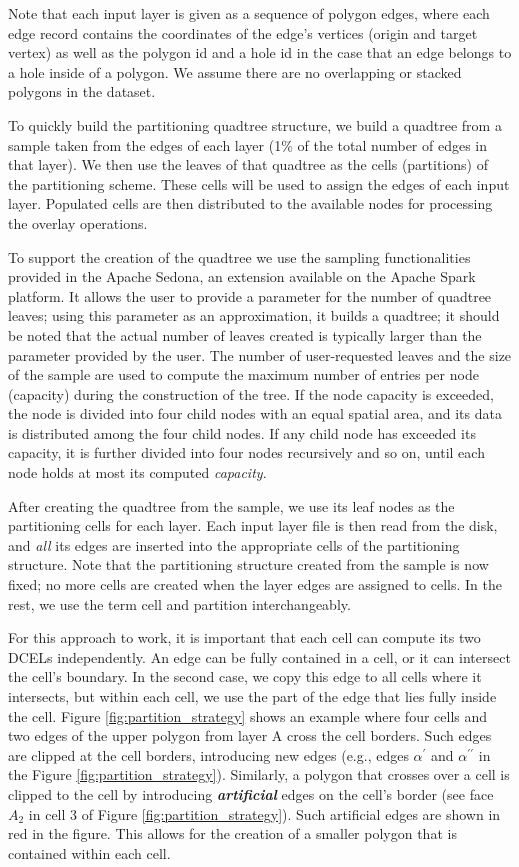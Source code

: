 Note that each input layer is given as a sequence of polygon edges, where each edge record contains the coordinates of the edge's vertices (origin and target 
vertex) as well as the polygon id and a hole id in the case that an edge belongs to a hole inside of a polygon. We assume there are no overlapping or stacked 
polygons in the dataset. 

To quickly build the partitioning quadtree structure, we build a quadtree from a sample taken from the edges of each layer (1\% of the total number of edges in 
that layer). We then use the leaves of that quadtree as the cells (partitions) of the partitioning scheme. These cells will be used to assign the edges of each 
input layer. Populated cells are then distributed to the available nodes for processing the overlay operations. 

To support the creation of the quadtree we use the sampling functionalities provided in the Apache Sedona, an extension available on the Apache Spark platform. 
It allows the user to provide a parameter for the number of quadtree leaves; using this parameter as an approximation, it builds a quadtree; it should be noted 
that the actual number of leaves created is typically larger than the parameter provided by the user. The number of user-requested leaves and the size of the 
sample are used to compute the maximum number of entries per node (capacity) during the construction of the tree.  If the node capacity is exceeded, the node is 
divided into four child nodes with an equal spatial area, and its data is distributed among the four child nodes.  If any child node has exceeded its capacity, 
it is further divided into four nodes recursively and so on, until each node holds at most its computed \textit{capacity}.

After creating the quadtree from the sample, we use its leaf nodes as the partitioning cells for each layer. Each input layer file is then read from the disk, 
and \textit{all} its edges are inserted into the appropriate cells of the partitioning structure. Note that the partitioning structure created from the sample 
is now fixed; no more cells are created when the layer edges are assigned to cells. In the rest, we use the term cell and partition interchangeably.

For this approach to work, it is important that each cell can compute its two DCELs independently. An edge can be fully contained in a cell, or it can intersect 
the cell's boundary. In the second case, we copy this edge to all cells where it intersects, but within each cell, we use the part of the edge that lies fully 
inside the cell. Figure \ref{fig:partition_strategy} shows an example where four cells and two edges of the upper polygon from layer A cross the cell borders. 
Such edges are clipped at the cell borders, introducing new edges (e.g., edges $\alpha^{\prime}$ and $\alpha^{\prime \prime}$ in the Figure 
\ref{fig:partition_strategy}).
Similarly, a polygon that crosses over a cell is clipped to the cell by introducing \textit{\textbf{artificial}} edges on the cell's border (see face $A_2$ in 
cell 3 of Figure \ref{fig:partition_strategy}). Such artificial edges are shown in red in the figure. This allows for the creation of a smaller polygon that is 
contained within each cell. 

